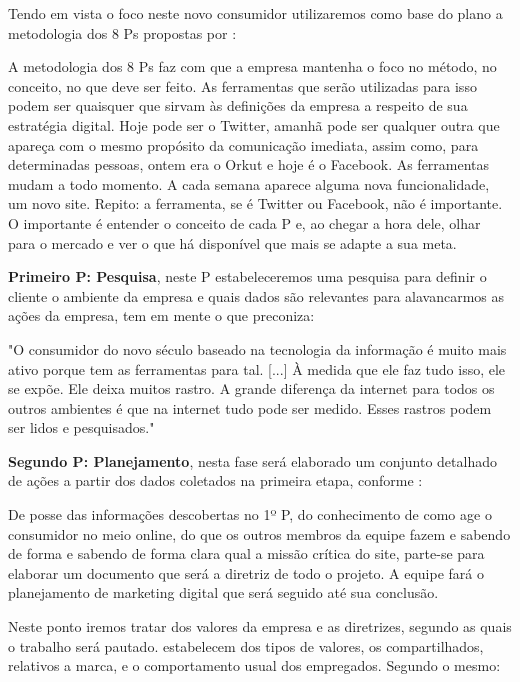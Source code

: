 Tendo em vista o foco neste novo consumidor utilizaremos como base do plano a metodologia dos 8 Ps propostas por :

\begin{citacao}
A metodologia dos 8 Ps faz com que a empresa mantenha o foco no método, no conceito, no que deve ser feito. As ferramentas que serão utilizadas para isso podem ser quaisquer que sirvam às definições da empresa a respeito de sua estratégia digital. Hoje pode ser o Twitter, amanhã pode ser qualquer outra que apareça com o mesmo propósito da comunicação imediata, assim como, para determinadas pessoas, ontem era o Orkut e hoje é o Facebook. As ferramentas mudam a todo momento. A cada semana aparece alguma nova funcionalidade, um novo site. Repito: a ferramenta, se é Twitter ou Facebook, não é importante. O importante é entender o conceito de cada P e, ao chegar a hora dele, olhar para o mercado e ver o que há disponível que mais se adapte a sua meta.
\end{citacao}

\textbf{Primeiro P: Pesquisa}, neste P estabeleceremos uma pesquisa para definir o cliente o ambiente da empresa e quais dados são relevantes para alavancarmos as ações da empresa, tem em mente o que  preconiza:
\begin{citacao}
"O consumidor do novo século baseado na tecnologia da informação é muito mais ativo porque tem as ferramentas para tal. [...] À medida que ele faz tudo isso, ele se expõe. Ele deixa muitos rastro. A grande diferença da internet para todos os outros ambientes é que na internet tudo pode ser medido. Esses rastros podem ser lidos e pesquisados."
\end{citacao}

\textbf{Segundo P: Planejamento}, nesta fase será elaborado um conjunto detalhado de ações a partir dos dados coletados na primeira etapa, conforme :

\begin{citacao}
De posse das informações descobertas no 1º P, do conhecimento de como age o consumidor no meio online, do que os outros membros da equipe fazem e sabendo de forma e sabendo de forma clara qual a missão crítica do site, parte-se para elaborar um documento que será a diretriz de todo o projeto. A equipe fará o planejamento de marketing digital que será seguido até sua conclusão.
\end{citacao}

Neste ponto iremos tratar dos valores da empresa e as diretrizes, segundo as quais o trabalho será pautado.  estabelecem dos tipos de valores, os compartilhados, relativos a marca, e o comportamento usual dos empregados. Segundo o mesmo:

